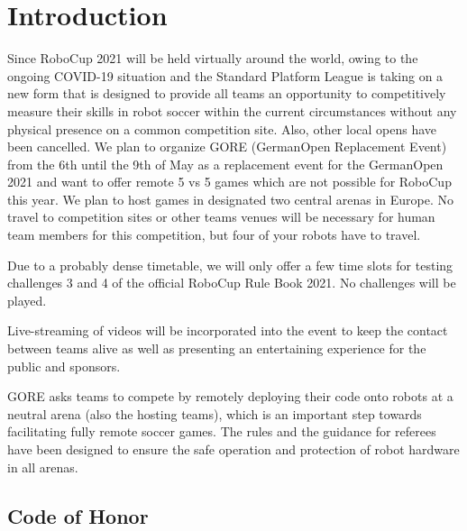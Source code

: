 \section{Introduction}

Since RoboCup 2021 will be held virtually around the world, owing to the ongoing COVID-19 situation and the Standard Platform League is taking on a new form that is designed to provide all teams an opportunity to competitively measure their skills in robot soccer within the current circumstances without any physical presence on a common competition site. Also, other local opens have been cancelled.
We plan to organize GORE (GermanOpen Replacement Event) from the 6th until the 9th of May as a replacement event for the GermanOpen 2021 and want to offer remote 5 vs 5 games which are not possible for RoboCup this year. We plan to host games in designated two central arenas in Europe. 
No travel to competition sites or other teams venues will be necessary for human team members for this competition, but four of your robots have to travel.

Due to a probably dense timetable, we will only offer a few time slots for testing challenges 3 and 4 of the official RoboCup Rule Book 2021. No challenges will be played.

Live-streaming of videos will be incorporated into the event to keep the contact between teams alive as well as presenting an entertaining experience for the public and sponsors.

GORE asks teams to compete by remotely deploying their code onto robots at a neutral arena (also the hosting teams), which is an important step towards facilitating fully remote soccer games. The rules and the guidance for referees have been designed to ensure the safe operation and protection of robot hardware in all arenas.

\subsection{Code of Honor}


